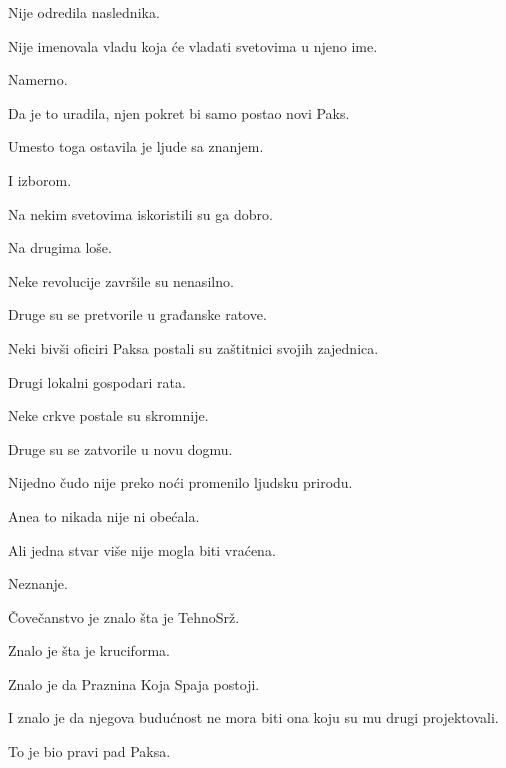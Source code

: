 Nije odredila naslednika.

Nije imenovala vladu koja će vladati svetovima u njeno ime.

\bigskip

Namerno.

\bigskip

Da je to uradila, njen pokret bi samo postao novi Paks.

\bigskip

Umesto toga ostavila je ljude sa znanjem.

\bigskip

I izborom.

\bigskip

Na nekim svetovima iskoristili su ga dobro.

\bigskip

Na drugima loše.

\bigskip

Neke revolucije završile su nenasilno.

Druge su se pretvorile u građanske ratove.

\bigskip

Neki bivši oficiri Paksa postali su zaštitnici svojih zajednica.

Drugi lokalni gospodari rata.

\bigskip

Neke crkve postale su skromnije.

Druge su se zatvorile u novu dogmu.

\bigskip

Nijedno čudo nije preko noći promenilo ljudsku prirodu.

\bigskip

Anea to nikada nije ni obećala.

\bigskip

Ali jedna stvar više nije mogla biti vraćena.

\bigskip

Neznanje.

\bigskip

Čovečanstvo je znalo šta je TehnoSrž.

Znalo je šta je kruciforma.

Znalo je da Praznina Koja Spaja postoji.

\bigskip

I znalo je da njegova budućnost ne mora biti ona koju su mu drugi projektovali.

\bigskip

To je bio pravi pad Paksa.

